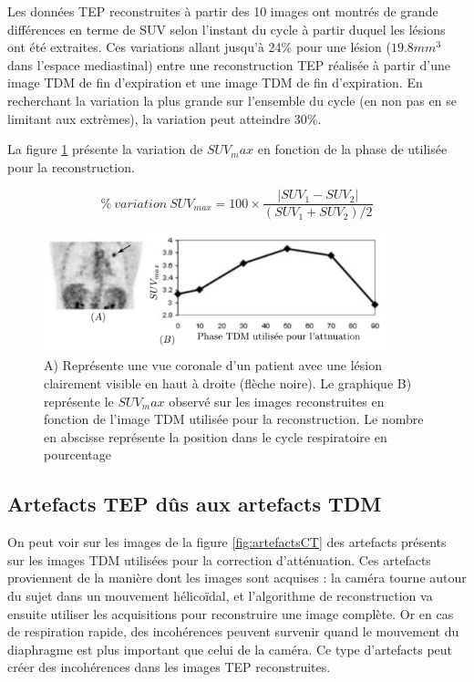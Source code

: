 Les données TEP reconstruites à partir des 10 images ont montrés de grande différences en terme de SUV selon l'instant du cycle à partir duquel les lésions ont été extraites.
Ces variations allant jusqu'à 24\% pour une lésion ($19.8 mm^3$ dans l'espace mediastinal) entre une reconstruction TEP réalisée à partir d'une image TDM de fin d'expiration et une image TDM de fin d'expiration. En recherchant la variation la plus grande sur l'ensemble du cycle (en non pas en se limitant aux extrèmes), la variation peut atteindre 30\%.

La figure \ref{fig:lesionEnFctPhaseTDM} présente la variation de $SUV_max$ en fonction de la phase de utilisée pour la reconstruction.

\begin{equation}
\label{eq:varSUV}
 \%~variation~SUV_{max} = 100 \times \frac{ | SUV_1 - SUV_2 | }{ (SUV_1 + SUV_2) / 2 }
\end{equation}

\begin{figure}[h!]
	\vspace{0.5cm}
	\centering
			\includegraphics[width=10cm]{images/lesionEnFctPhaseTDM}
	\vspace{-0.5cm}
	\caption{A) Représente une vue coronale d'un patient avec une lésion clairement visible en haut à droite (flèche noire). Le graphique B) représente le $SUV_max$ observé sur les images reconstruites en fonction de l'image TDM utilisée pour la reconstruction. Le nombre en abscisse représente la position dans le cycle respiratoire en pourcentage} 
	\label{fig:lesionEnFctPhaseTDM}
\end{figure}

\subsection{Artefacts TEP dûs aux artefacts TDM}

On peut voir sur les images de la figure \ref{fig:artefactsCT} des artefacts présents sur les images TDM utilisées pour la correction d'atténuation. Ces artefacts proviennent de la manière dont les images sont acquises : la caméra tourne autour du sujet dans un mouvement hélicoïdal, et l'algorithme de reconstruction va ensuite utiliser les acquisitions pour reconstruire une image complète. Or en cas de respiration rapide, des incohérences peuvent survenir quand le mouvement du diaphragme est plus important que celui de la caméra. Ce type d'artefacts peut créer des incohérences dans les images TEP reconstruites.

